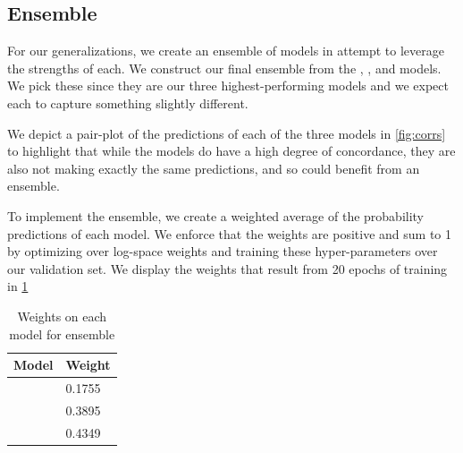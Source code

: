 \documentclass[11pt]{article}
\begin{document}
\subsection{Ensemble}
\label{subsec:ensemble}

For our generalizations, we create an ensemble of models in attempt to leverage
the strengths of each. We construct our final ensemble from the
, , and 
models. We pick these since they are our three highest-performing models and we
expect each to capture something slightly different.

We depict a pair-plot of the predictions of each of the three models in
\cref{fig:corrs} to highlight that while the models do have a high degree of
concordance, they are also not making exactly the same predictions, and so could
benefit from an ensemble.

To implement the ensemble, we create a weighted average of the probability
predictions of each model. We enforce that the weights are positive and sum to 1
by optimizing over log-space weights and training these hyper-parameters over
our validation set. We display the weights that result from 20 epochs of
training in \cref{tab:ensemble}

\begin{table}
\centering
\begin{tabular}{ll}
\toprule
Model & Weight \\
\midrule
\nameref{subsec:nb}  & 0.1755 \\
\nameref{subsec:logistic} & 0.3895 \\
\nameref{subsec:convnet} & 0.4349 \\
\bottomrule
\end{tabular}
\caption{Weights on each model for ensemble}
\label{tab:ensemble}
\end{table}
\end{document}
